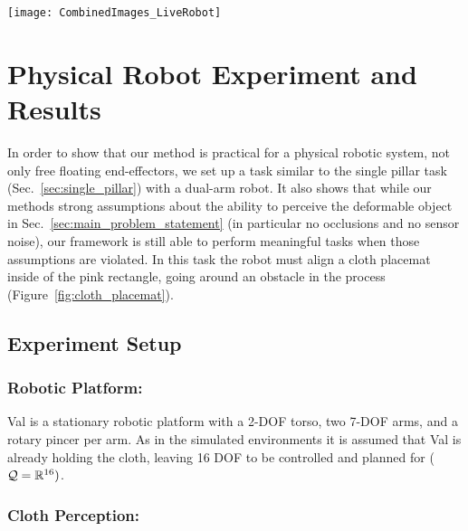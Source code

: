 
\begin{figure*}[ht]
    \centering
    \texttt{[image: CombinedImages\_LiveRobot]}
    \vspace{-1.7in}
    \caption{Cloth placemat task. The placemat starts on the far side of an obstacle and must be aligned with the pink rectangle near the robot.}
    \label{fig:cloth_placemat}
\end{figure*}



\section{Physical Robot Experiment and Results}
\label{sec:live_robot}

In order to show that our method is practical for a physical robotic system, not only free floating end-effectors, we set up a task similar to the single pillar task (Sec.~\ref{sec:single_pillar}) with a dual-arm robot. It also shows that while our methods strong assumptions about the ability to perceive the deformable object in Sec.~\ref{sec:main_problem_statement} (in particular no occlusions and no sensor noise), our framework is still able to perform meaningful tasks when those assumptions are violated. In this task the robot must align a cloth placemat inside of the pink rectangle, going around an obstacle in the process (Figure~\ref{fig:cloth_placemat}).


\subsection{Experiment Setup}

\subsubsection{Robotic Platform:}
Val is a stationary robotic platform with a 2-DOF torso, two 7-DOF arms, and a rotary pincer per arm. As in the simulated environments it is assumed that Val is already holding the cloth, leaving 16 DOF to be controlled and planned for ($\mathcal{Q} = \mathbb{R}^{16})$.


\subsubsection{Cloth Perception:}
\label{sec:cloth_perception}

